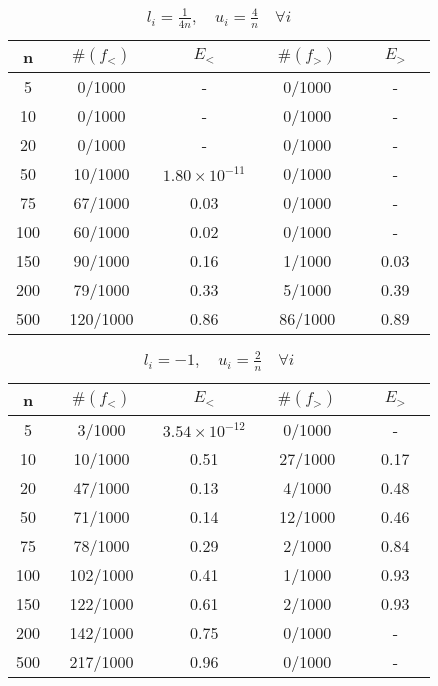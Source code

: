 \begin{table}
\begin{center}
\begin{tabular}{ c | c | c | c | c}
n &  $\quad \#(f_<) \quad$ & $\quad E_< \quad$ &  $\quad \#(f_>) \quad$ & $ \quad E_> \quad$  \\\hline
5 & 0/1000     & - & 0/1000 & -     \\\hline
10 & 0/1000    & -   & 0/1000 & -        \\\hline
20 & 0/1000    & -   & 0/1000 & -        \\\hline
50 & 10/1000   & $1.80 \times 10^{-11} $ & 0/1000 & -       \\\hline
75 & 67/1000  & 0.03  & 0/1000 & -      \\\hline
100 & 60/1000 & 0.02  & 0/1000 & -    \\\hline
150 & 90/1000 & 0.16 & 1/1000 & 0.03       \\\hline
200 & 79/1000 & 0.33 & 5/1000 & 0.39       \\\hline
500 & 120/1000 & 0.86 & 86/1000 & 0.89     \\\hline
\end{tabular}
\caption{$l_i = \frac{1}{4n}, \quad u_i = \frac{4}{n} \quad \forall i$}
\label{tab:results2}
\end{center}
\end{table}


\begin{table}
\begin{center}
\begin{tabular}{ c | c | c | c | c}

n &  $\quad \#(f_<) \quad$ & $\quad E_< \quad$ &  $\quad \#(f_>) \quad$ & $ \quad E_> \quad$  \\\hline
5  & 3/1000    & $3.54 \times 10^{-12} $&    0/1000 & -  \\\hline
10 & 10/1000   & 0.51 &    27/1000 & 0.17  \\\hline
20 & 47/1000   & 0.13 &     4/1000 & 0.48     \\\hline
50 & 71/1000   & 0.14 &     12/1000 & 0.46     \\\hline
75 & 78/1000   & 0.29 &     2/1000 & 0.84     \\\hline
100 & 102/1000   & 0.41 &     1/1000 & 0.93     \\\hline
150 & 122/1000   & 0.61 &     2/1000 & 0.93    \\\hline
200 & 142/1000   & 0.75 &     0/1000 & -   \\\hline
500 & 217/1000   & 0.96 &     0/1000 & -   \\\hline
\end{tabular}
\caption{$l_i = -1, \quad u_i = \frac{2}{n} \quad \forall i$}
\label{tab:results3}
\end{center}
\end{table}

